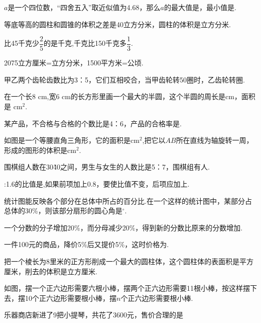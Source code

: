 \documentclass[marginline,answers]{BHCexam}
\begin{document}
\fubiaoti{}
\maketitle

\begin{questions}
\tiankong
\question $a$是一个四位数，“四舍五入”取近似值为4.68，那么$a$的最大值是，最小值是.

\question 等底等高的圆柱和圆锥的体积之差是40立方分米，圆柱的体积是立方分米.

\question 比45千克少$\dfrac{2}{5}$的是千克,千克比150千克多$\dfrac{1}{3}$.

\question 2075立方厘米=立方分米，1500平方米=公顷.

\question 甲乙两个齿轮齿数比为3：5，它们互相咬合，当甲齿轮转50圈时，乙齿轮转圈.

\question 在一个长8 cm,宽6 cm的长方形里画一个最大的半圆，这个半圆的周长是cm，面积是 cm$^{2}$.

\question 某产品，不合格与合格的个数比是4：6，产品的合格率是.

\question 如图是一个等腰直角三角形，它的面积是cm$^{2}$,把它以$AB$所在直线为轴旋转一周，形成的图形的体积是cm$^{2}$.

\question 围棋组人数在30\~40之间，男生与女生的人数比是5：7，围棋组有人.

:1.6的比值是,如果前项加上0.8，要使比值不变，后项应加上.

\question {}统计图能反映各个部分在总体中所占的百分比.在一个这样的统计图中，某部分占总体的30\%，则该部分扇形的圆心角是$^\circ$.

\question 一个分数的分子增加20\%，而分母减少20\%，得到新的分数比原来的分数增加.

\question 一件100元的商品，降价5\%后又提价5\%，这时价格为.

\question 把一个棱长为8里米的正方形削成一个最大的圆柱体，这个圆柱体的表面积是平方厘米，削去的体积是立方厘米.

\question 如图，摆一个正六边形需要六根小棒，摆两个正六边形需要11根小棒，按这样摆下去，摆10个正六边形需要根小棒，摆$n$个正六边形需要根小棒.


\xuanze

\question 乐器商店新进了9把小提琴，共花了3600元，售价合理的是


\end{questions}
\end{document}
